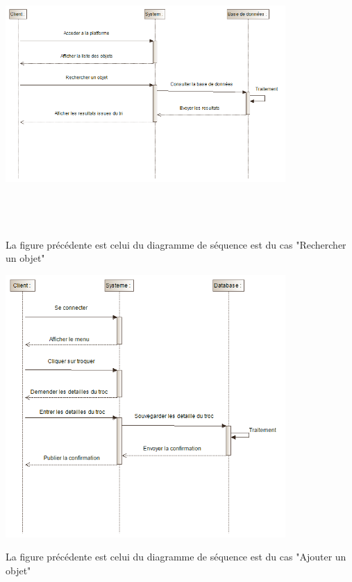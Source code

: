 \documentclass[12pt]{report}
\begin{document}
			\begin{center}
			
				\includegraphics[scale=1, width=0.8\textwidth, height=10cm]{troc0}
				\label{troc0}
			\end{center}
		La figure précédente est celui du diagramme de séquence est du cas "Rechercher un objet"
			\begin{center}
				
				\includegraphics[scale=1, width=0.8\textwidth, height=10cm]{troc1}
				
				\label{troc1}
			\end{center}
			La figure précédente est celui du diagramme de séquence est du cas "Ajouter un objet"
\end{document}
